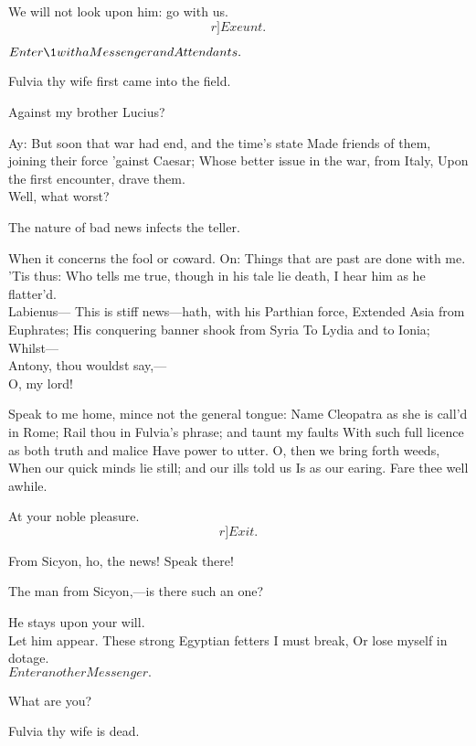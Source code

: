 \documentclass{book}
\begin{document}
\2	We will not look upon him: go with us. \[r]Exeunt.\]

	\(Enter \1 with a Messenger and Attendants.\)

	Fulvia thy wife first came into the field.

\1	Against my brother Lucius?

	Ay:
	But soon that war had end, and the time's state
	Made friends of them, joining their force 'gainst Caesar;
	Whose better issue in the war, from Italy,
	Upon the first encounter, drave them. \\

\1	Well, what worst?

	The nature of bad news infects the teller.

\1	When it concerns the fool or coward. On:
	Things that are past are done with me. 'Tis thus:
	Who tells me true, though in his tale lie death,
	I hear him as he flatter'd. \\

	Labienus---
	This is stiff news---hath, with his Parthian force,
	Extended Asia from Euphrates;
	His conquering banner shook from Syria
	To Lydia and to Ionia;
        Whilst--- \\

\1	Antony, thou wouldst say,--- \\

	O, my lord!

\1	Speak to me home, mince not the general tongue:
	Name Cleopatra as she is call'd in Rome;
	Rail thou in Fulvia's phrase; and taunt my faults
	With such full licence as both truth and malice
	Have power to utter. O, then we bring forth weeds,
	When our quick minds lie still; and our ills told us
	Is as our earing. Fare thee well awhile.

	At your noble pleasure. \[r]Exit.\]

\1	From Sicyon, ho, the news! Speak there!

	The man from Sicyon,---is there such an one?

	He stays upon your will. \\

\1	Let him appear.
	These strong Egyptian fetters I must break,
	Or lose myself in dotage. \\

	\(Enter another Messenger.\)

		    What are you?

	Fulvia thy wife is dead. \\
\end{document}
